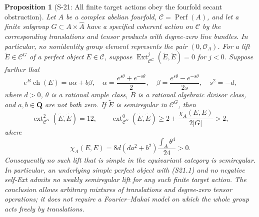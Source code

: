 \documentclass[11pt,a4paper]{article}
\newtheorem{proposition}[theorem]{Proposition}
\theoremstyle{definition}
\begin{document}
\begin{proposition}[S-21: All finite target actions obey the fourfold secant obstruction]
\label{prop:semireg-all-finite-target-actions}
Let $A$ be a complex abelian fourfold, $\mathcal C=
\operatorname{Perf}(A)$, and let a finite subgroup
$G\subset A\times\widehat A$ have a specified coherent action
on $\mathcal C$ by the corresponding translations and
tensor products with degree-zero line bundles. In particular,
no nonidentity group element represents the pair $(0,\mathcal O_A)$.
For a lift $\widetilde E\in\mathcal C^G$ of a perfect object
$E\in\mathcal C$, suppose
$\operatorname{Ext}^{j}_{\mathcal C^G}(\widetilde E,
\widetilde E)=0$ for $j<0$. Suppose further that
\[
 e^B\operatorname{ch}(E)=a\alpha+b\beta,
 \quad
 \alpha=\frac{e^{s\theta}+e^{-s\theta}}2,
 \quad
 \beta=\frac{e^{s\theta}-e^{-s\theta}}{2s},
 \quad s^2=-d,
 \tag{S21.1}
\]
where $d>0$, $\theta$ is a rational ample class,
$B$ is a rational algebraic divisor class, and
$a,b\in\mathbf Q$ are not both zero.
If $\widetilde E$ is semiregular in $\mathcal C^G$, then
\[
 \operatorname{ext}^2_{\mathcal C^G}(\widetilde E,
              \widetilde E)=12,
 \qquad
 \operatorname{ext}^0_{\mathcal C^G}(\widetilde E,
              \widetilde E)
 \ge 2+\frac{\chi_A(E,E)}{2|G|}>2,
 \tag{S21.2}
\]
where
\[
 \chi_A(E,E)=8d(da^2+b^2)\frac{\int_A\theta^4}{24}>0.
 \tag{S21.3}
\]
Consequently no such lift that is simple in the equivariant
category is semiregular. In particular, an underlying simple
perfect object with (S21.1) and no negative self-Ext admits no
weakly semiregular lift for any such finite target action.
The conclusion allows arbitrary mixtures of translations
and degree-zero tensor operations; it does not require a
Fourier--Mukai model on which the whole group acts freely
by translations.
\end{proposition}
\end{document}
